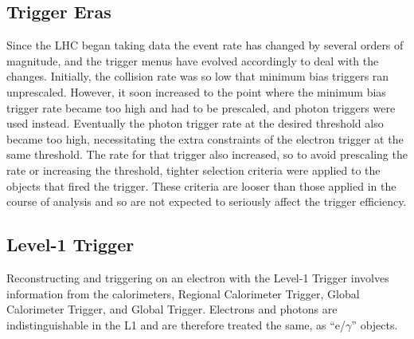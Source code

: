 \subsection{Trigger Eras}
Since the LHC began taking data the event rate has changed by several orders of magnitude,  
and the trigger menus have evolved accordingly to deal with the changes.  
Initially, the collision rate was so low that minimum bias triggers ran unprescaled.  
However, it soon increased to the point where the minimum bias trigger rate became too high
and had to be prescaled, and photon triggers were used instead.  
Eventually the photon trigger rate at the desired threshold also became too high,
necessitating the extra constraints of the electron trigger at the same threshold.  
The rate for that trigger also increased, so to avoid prescaling the rate or increasing the threshold,
tighter selection criteria were applied to the objects that fired the trigger.  
These criteria are looser than those applied in the course of analysis and so are not expected
to seriously affect the trigger efficiency.  



\subsection{Level-1 Trigger}
Reconstructing and triggering on an electron with the Level-1 Trigger 
involves information from the calorimeters, 
Regional Calorimeter Trigger, Global Calorimeter Trigger, and 
Global Trigger.  
Electrons and photons are indistinguishable in the L1 and are therefore 
treated the same, as ``e/$\gamma$'' objects.  

